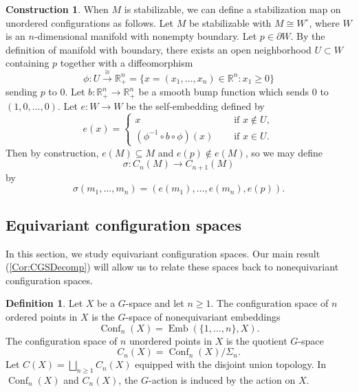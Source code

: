 \documentclass[11pt]{amsart}
\makeatletter
\theoremstyle{definition}
\newtheorem{definition}[equation]{Definition}
\newtheorem{construction}[equation]{Construction}
\numberwithin{equation}{subsection} %
\def\r{\mathbb{R}}
\newcommand{\Conf}{\operatorname{Conf}}
\def\Emb{\operatorname{Emb}}
\newcommand{\switchmargin}{
\if@reversemargin
\normalmarginpar
\else
\reversemarginpar
\fi
}
\newcommand{\highlighteva}[1]{\ifmmode{\text{\sethlcolor{llgray}\hl{$#1$}}}\else{\sethlcolor{llteal}\hl{#1}}\fi}
\newcommand{\EvaNoteHl}[2]{\marginnote{\smaller \smaller \color{teal}
#2}{\highlighteva{#1}}\switchmargin}
\makeatother
\begin{document}
\begin{construction}
\label{Constr:nonequivariant-stabilization}
When $M$ is stabilizable, we can define a stabilization map on unordered configurations as follows. Let $M$ be stabilizable with $M \cong W^\circ$, where $W$ is an $n$-dimensional manifold with nonempty boundary. Let $p \in \partial W$. By the definition of manifold with boundary, 
there exists an open neighborhood $U \subset W$ containing $p$ together with a diffeomorphism 
$$\phi: U \xrightarrow{\cong} \r^n_+ = \{ x = (x_1,\ldots,x_n) \in \r^n : x_1 \geq 0\}$$ 
sending $p$ to $0$. Let $b: \r^n_+ \to \r^n_+$ be a smooth bump function which  sends $0$ to $(1,0,\ldots,0)$. Let $e: W \to W$ be the self-embedding defined by
$$e(x) = \begin{cases}
	x \quad & \text{ if } x \notin U, \\
	(\phi^{-1} \circ b \circ \phi)(x) \quad & \text{ if } x \in U.
\end{cases}$$
Then by construction, $e(M) \subseteq M$ and $e(p) \notin e(M)$, so we may define 
\begin{equation}\label{eq:sigma}
\sigma: C_n(M) \to C_{n+1}(M)
\end{equation}
by
$$\sigma(m_1,\ldots,m_n) = (e(m_1),\ldots,e(m_n),e(p)).$$
\end{construction}


\subsection{Equivariant configuration spaces}\label{SS:CGS}

In this section, we study equivariant configuration spaces. Our main result (\cref{Cor:CGSDecomp}) will allow us to relate these spaces back to nonequivariant configuration spaces. 

\begin{definition}\label{Def:ConfG-equivariant}
Let $X$ be a $G$-space and let $n\geq 1$. The configuration space of $n$ ordered
points in $X$ is the $G$-space of nonequivariant embeddings
$$ \Conf_n(X) = \Emb(\{ 1,\dots,n \},X). $$
The configuration space of $n$ unordered points in $X$ is the quotient $G$-space
$$ C_n(X) = \Conf_n(X)/\Sigma_n. $$
Let $C(X) = \bigsqcup_{n\geq 1} C_n(X)$ equipped with the disjoint union topology. In $\Conf_n(X)$ and $C_n(X)$, the $G$-action is induced by the action on $X$.
\end{definition}
\end{document}

